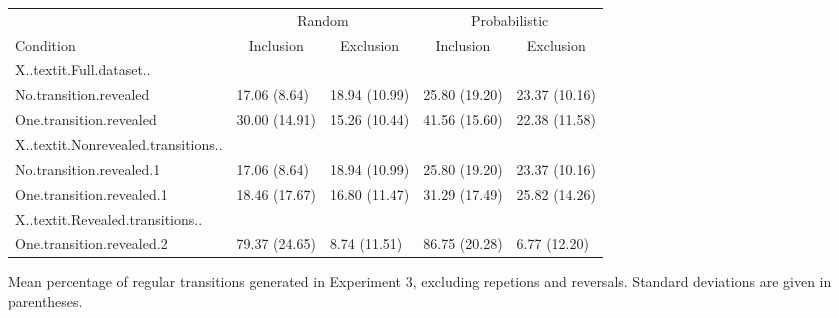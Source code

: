 \documentclass[english,,man]{apa6}
\begin{document}
\begin{appendix}
\begin{table}[hp]
\begin{center}
\begin{threeparttable}
\begin{tabular}{lllll}
\toprule
& \multicolumn{2}{c}{Random} & \multicolumn{2}{c}{Probabilistic} \\
\cmidrule(r){2-3} \cmidrule(r){4-5}
Condition & \multicolumn{1}{c}{Inclusion} & \multicolumn{1}{c}{Exclusion} & \multicolumn{1}{c}{Inclusion} & \multicolumn{1}{c}{Exclusion}\\
\midrule
X..textit.Full.dataset.. &  &  &  & \\
No.transition.revealed & 17.06 (8.64) & 18.94 (10.99) & 25.80 (19.20) & 23.37 (10.16)\\
One.transition.revealed & 30.00 (14.91) & 15.26 (10.44) & 41.56 (15.60) & 22.38 (11.58)\\
X..textit.Nonrevealed.transitions.. &  &  &  & \\
No.transition.revealed.1 & 17.06 (8.64) & 18.94 (10.99) & 25.80 (19.20) & 23.37 (10.16)\\
One.transition.revealed.1 & 18.46 (17.67) & 16.80 (11.47) & 31.29 (17.49) & 25.82 (14.26)\\
X..textit.Revealed.transitions.. &  &  &  & \\
One.transition.revealed.2 & 79.37 (24.65) & 8.74 (11.51) & 86.75 (20.28) & 6.77 (12.20)\\
\bottomrule
\end{tabular}

\end{threeparttable}
\end{center}

\end{table}

\begin{table}[hp]

\begin{center}
\begin{threeparttable}

\caption{\label{tab:appendix-pdl10-generation}Mean percentage of regular transitions generated in Experiment 3, excluding repetions and reversals. Standard deviations are given in parentheses.}


\end{threeparttable}
\end{center}
\end{table}
\end{appendix}
\end{document}
